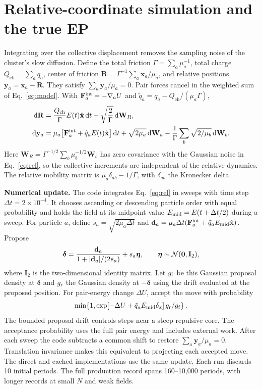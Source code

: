 \documentclass[11pt,letterpaper]{article}
\newcommand{\ch}{Q_{\mathrm{ch}}}
\newcommand{\ex}{\hat{\mathbf x}}
\newcommand{\dd}{\mathrm d}
\begin{document}
\section{Relative-coordinate simulation and the true EP}
Integrating over the collective displacement removes the sampling noise of the cluster's slow diffusion.
Define the total friction $\Gamma=\sum_a\mu_a^{-1}$, total charge $\ch=\sum_a q_a$,
center of friction $\mathbf R=\Gamma^{-1}\sum_a\mathbf x_a/\mu_a$, and relative positions
$\mathbf y_a=\mathbf x_a-\mathbf R$. They satisfy $\sum_a \mathbf y_a/\mu_a=0$.
Pair forces cancel in the weighted sum of Eq.~\eqref{eq:model}. With
$\mathbf F_a^{\rm int}=-\nabla_a U$ and $\tilde q_a=q_a-\ch/(\mu_a\Gamma)$,
\begin{align}
 \dd\mathbf R&=\frac{\ch}{\Gamma}E(t)\ex\,\dd t+\sqrt{\frac{2}{\Gamma}}\,\dd\mathbf W_R ,
 \label{eq:cm}\\
 \dd\mathbf y_a&=\mu_a\big[\mathbf F_a^{\rm int}+\tilde q_a E(t)\ex\big]\,\dd t
 +\sqrt{2\mu_a}\,\dd\mathbf W_a-\frac1{\Gamma}\sum_b\sqrt{2/\mu_b}\,\dd\mathbf W_b .
 \label{eq:rel}
\end{align}
Here $\mathbf W_R=\Gamma^{-1/2}\sum_b\mu_b^{-1/2}\mathbf W_b$ has zero covariance with the
Gaussian noise in Eq.~\eqref{eq:rel}, so the collective increments are independent of the
relative dynamics. The relative mobility matrix is $\mu_a\delta_{ab}-1/\Gamma$, with
$\delta_{ab}$ the Kronecker delta.

\textbf{Numerical update.}
The code integrates Eq.~\eqref{eq:rel} in sweeps with time step $\Delta t=2\times10^{-4}$.
It chooses ascending or descending particle order with equal probability and holds the field
at its midpoint value $E_{\rm mid}=E(t+\Delta t/2)$ during a sweep. For particle $a$, define
$s_a=\sqrt{2\mu_a\Delta t}$ and $\mathbf d_a=\mu_a\Delta t(\mathbf F_a^{\rm int}+\tilde q_a E_{\rm mid}\ex)$.
Propose
\begin{equation}
 \boldsymbol\delta=\frac{\mathbf d_a}{1+|\mathbf d_a|/(2s_a)}+s_a\boldsymbol\eta ,
 \qquad \boldsymbol\eta\sim{\cal N}(\mathbf 0,\mathbf I_2),
\end{equation}
where $\mathbf I_2$ is the two-dimensional identity matrix. Let $g_{\rm f}$ be this Gaussian
proposal density at $\boldsymbol\delta$ and $g_{\rm r}$ the Gaussian density at
$-\boldsymbol\delta$ using the drift evaluated at the proposed position. For pair-energy change
$\Delta U$, accept the move with probability
\begin{equation}
 \min\!\left\{1,\exp[-\Delta U+\tilde q_a E_{\rm mid}\delta_x]\,g_{\rm r}/g_{\rm f}\right\}.
\end{equation}
The bounded proposal drift controls steps near a steep repulsive core. The acceptance probability
uses the full pair energy and includes external work. After each sweep the code subtracts a common
shift to restore $\sum_a\mathbf y_a/\mu_a=0$. Translation invariance makes this equivalent to
projecting each accepted move. The direct and cached implementations use the same update. Each run
discards 10 initial periods. The full production record spans 160--10,000 periods, with longer
records at small $N$ and weak fields.
\end{document}
